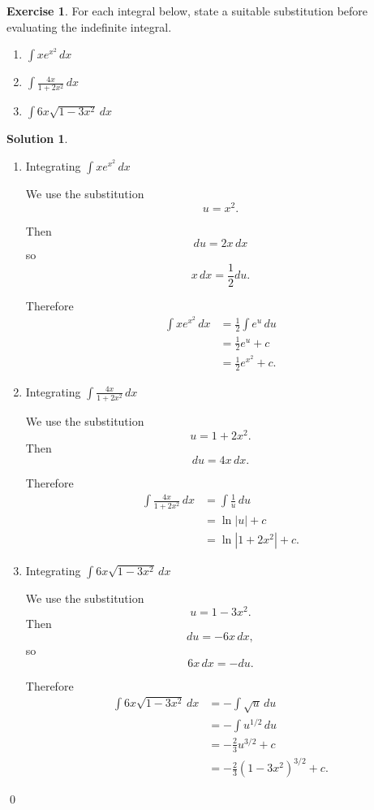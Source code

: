 \documentclass[a4paper]{article}
\theoremstyle{plain}
\theoremstyle{definition}
\newtheorem*{solution}{Solution}
\newtheorem{exercise}{Exercise}
\numberwithin{equation}{subsection}
\begin{document}

\begin{exercise}
For each integral below, state a suitable substitution before evaluating the indefinite integral.
\begin{enumerate}
    \item $\displaystyle \int x e^{x^2}\,dx$
    \item $\displaystyle \int \frac{4x}{1+2x^2}\,dx$
    \item $\displaystyle \int 6x\sqrt{1-3x^2}\,dx$
\end{enumerate}
\end{exercise}

\begin{solution}

\begin{enumerate}
    \item Integrating $\displaystyle \int x e^{x^2}\,dx$

    We use the substitution
    \[
        u = x^2.
    \]

    Then
    \[
        du = 2x\,dx
    \]
    so
    \[
        x\,dx = \frac{1}{2}du.
    \]

    Therefore
    \begin{align*}
        \int x e^{x^2}\,dx
        &= \frac{1}{2}\int e^u\,du\\
        &= \frac{1}{2}e^u + c\\
        &= \frac{1}{2}e^{x^2} + c.
    \end{align*}

    \item Integrating $\displaystyle \int \frac{4x}{1+2x^2}\,dx$

    We use the substitution
    \[
        u = 1+2x^2.
    \]
    Then
    \[
        du = 4x\,dx.
    \]

    Therefore
    \begin{align*}
        \int \frac{4x}{1+2x^2}\,dx
        &= \int \frac{1}{u}\,du\\
        &= \ln|u| + c\\
        &= \ln|1+2x^2| + c.
    \end{align*}

    \item Integrating $\displaystyle \int 6x\sqrt{1-3x^2}\,dx$

    We use the substitution
    \[
        u = 1-3x^2.
    \]
    Then
    \[
        du = -6x\,dx,
    \]
    so
    \[
        6x\,dx = -du.
    \]

    Therefore
    \begin{align*}
        \int 6x\sqrt{1-3x^2}\,dx
        &= -\int \sqrt{u}\,du\\
        &= -\int u^{1/2}\,du\\
        &= -\frac{2}{3}u^{3/2} + c\\
        &= -\frac{2}{3}(1-3x^2)^{3/2} + c.
    \end{align*}
\end{enumerate}
\qed
\end{solution}
\end{document}
